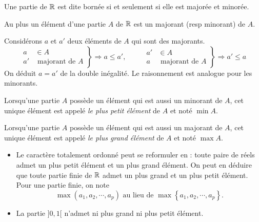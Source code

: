 \begin{defi}
  Une partie de $\mathbb{R}$ est dite bornée si et seulement si elle est majorée et minorée.
\end{defi}

\begin{prop}
  Au plus un élément d'une partie $A$ de $\mathbb{R}$ est un majorant (resp minorant) de $A$.
\end{prop}
\begin{demo}
  Considérons $a$ et $a'$ deux éléments de $A$ qui sont des majorants.
\begin{displaymath}
 \left. 
 \begin{aligned}
  a &\in A \\ a' &\text{ majorant de }A
 \end{aligned}
\right\rbrace \Rightarrow a \leq a'
,\hspace{1cm}
 \left. 
 \begin{aligned}
  a' &\in A \\ a &\text{ majorant de }A
 \end{aligned}
\right\rbrace \Rightarrow a' \leq a
\end{displaymath}
On déduit $a=a'$ de la double inégalité. Le raisonnement est analogue pour les minorants.
\end{demo}
\begin{defi}
  Lorsqu'une partie $A$ possède un élément qui est aussi un minorant de $A$, cet unique élément est appelé \emph{le plus petit élément} de $A$ et noté $\min A$.
\end{defi}
\begin{defi}
  Lorsqu'une partie $A$ possède un élément qui est aussi un majorant de $A$, cet unique élément est appelé \emph{le plus grand élément} de $A$ et noté $\max A$.
\end{defi}
\begin{rems}
  \begin{itemize}
    \item Le caractère totalement ordonné peut se reformuler en : toute paire de réels admet un plus petit élément et un plus grand élément. On peut en déduire que toute partie finie de $\mathbb{R}$ admet un plus grand et un plus petit élément. Pour une partie finie, on note
\begin{displaymath}
  \max(a_1,a_2, \cdots, a_p) \text{ au lieu de } \max\left\lbrace a_1,a_2, \cdots, a_p\right\rbrace .
\end{displaymath}
    \item La partie $]0,1[$ n'admet ni plus grand ni plus petit élément.
  \end{itemize} 
\end{rems}

